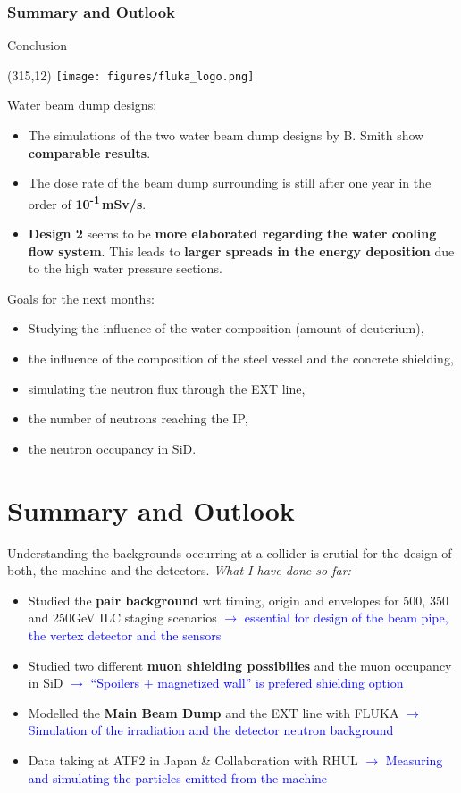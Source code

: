 \documentclass[xcolor={dvipsnames}]{beamer}
\newcommand{\flukalogo}{
  \setlength{\TPHorizModule}{1pt}
  \setlength{\TPVertModule}{1pt}
  \begin{textblock}{1}(315,12)
   \texttt{[image: figures/fluka\_logo.png]}
  \end{textblock}
}
\begin{document}
\subsubsection{Summary and Outlook}
\begin{frame}{Conclusion}
 \flukalogo
 Water beam dump designs:
 \begin{itemize}
  \item The simulations of the two water beam dump designs by B. Smith show \textbf{comparable results}.
  \item The dose rate of the beam dump surrounding is still after one year in the order of \textbf{10\textsuperscript{-1}\,mSv/s}.
  \item \textbf{Design 2} seems to be \textbf{more elaborated regarding the water cooling flow system}.
  This leads to \textbf{larger spreads in the energy deposition} due to the high water pressure sections.
 \end{itemize}
 Goals for the next months:
\begin{itemize}
 \item Studying the influence of the water composition (amount of deuterium),
 \item the influence of the composition of the steel vessel and the concrete shielding,
 \item simulating the neutron flux through the EXT line,
 \item the number of neutrons reaching the IP,
 \item the neutron occupancy in SiD.
\end{itemize}
\end{frame}


\section{Summary and Outlook}
\begin{frame}
Understanding the backgrounds occurring at a collider is crutial for the design of both, the machine and the detectors.
\textit{What I have done so far:}
 \begin{itemize} 
  \item Studied the \textbf{pair background} wrt timing, origin and envelopes for 500, 350 and 250GeV ILC staging scenarios \textcolor{Blue}{$\rightarrow$ essential for design of the beam pipe, the vertex detector and the sensors}
  \item Studied two different \textbf{muon shielding possibilies} and the muon occupancy in SiD \textcolor{Blue}{$\rightarrow$ ``Spoilers + magnetized wall'' is prefered shielding option}
  \item Modelled the \textbf{Main Beam Dump} and the EXT line with FLUKA \textcolor{Blue}{$\rightarrow$ Simulation of the irradiation and the detector neutron background}
  \item Data taking at ATF2 in Japan \& Collaboration with RHUL \textcolor{Blue}{$\rightarrow$ Measuring and simulating the particles emitted from the machine}
 \end{itemize}
\end{frame}
\end{document}
